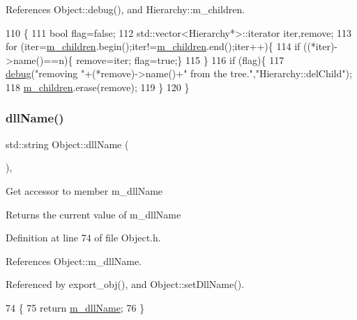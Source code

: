 References Object\+::debug(), and Hierarchy\+::m\+\_\+children.


\begin{DoxyCode}
110                                    \{
111   \textcolor{keywordtype}{bool} flag=\textcolor{keyword}{false};
112   std::vector<Hierarchy*>::iterator iter,\textcolor{keyword}{remove};
113   \textcolor{keywordflow}{for} (iter=\hyperlink{classHierarchy_a038816763941fd4a930504917f60483b}{m\_children}.begin();iter!=\hyperlink{classHierarchy_a038816763941fd4a930504917f60483b}{m\_children}.end();iter++)\{
114     \textcolor{keywordflow}{if} ((*iter)->name()==n)\{ \textcolor{keyword}{remove}=iter; flag=\textcolor{keyword}{true};\}
115   \}
116   \textcolor{keywordflow}{if} (flag)\{
117     \hyperlink{classObject_aac010553f022165573714b7014a15f0d}{debug}(\textcolor{stringliteral}{"removing "}+(*remove)->name()+\textcolor{stringliteral}{" from the tree."},\textcolor{stringliteral}{"Hierarchy::delChild"});
118     \hyperlink{classHierarchy_a038816763941fd4a930504917f60483b}{m\_children}.erase(\textcolor{keyword}{remove});
119   \}
120 \}
\end{DoxyCode}
\mbox{\label{classObject_a2e3947f2870094c332d7454117f3ec63}} 
\subsubsection{\texorpdfstring{dll\+Name()}{dllName()}}
{\footnotesize\ttfamily std\+::string Object\+::dll\+Name (\begin{DoxyParamCaption}{ }\end{DoxyParamCaption})\hspace{0.3cm}{\ttfamily [inline]}, {\ttfamily [inherited]}}

Get accessor to member m\+\_\+dll\+Name \begin{DoxyReturn}{Returns}
the current value of m\+\_\+dll\+Name 
\end{DoxyReturn}


Definition at line 74 of file Object.\+h.



References Object\+::m\+\_\+dll\+Name.



Referenced by export\+\_\+obj(), and Object\+::set\+Dll\+Name().


\begin{DoxyCode}
74                        \{
75     \textcolor{keywordflow}{return} \hyperlink{classObject_a01afbeacebb8db6831559972ec362eb3}{m\_dllName};
76   \}  
\end{DoxyCode}
\mbox{\label{classICECALv3_ac26be912fb72e615106fceb4626aa548}} 
